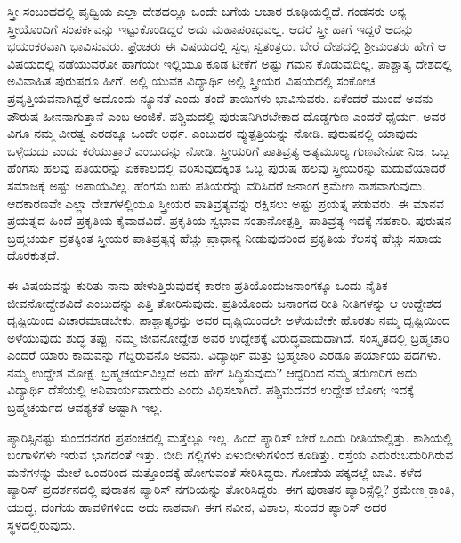 ಸ್ತ್ರೀ ಸಂಬಂಧದಲ್ಲಿ ಪೃಥ್ವಿಯ ಎಲ್ಲಾ ದೇಶದಲ್ಲೂ ಒಂದೇ ಬಗೆಯ ಆಚಾರ ರೂಢಿಯಲ್ಲಿದೆ. ಗಂಡಸರು ಅನ್ಯ ಸ್ತ್ರೀಯೊಂದಿಗೆ ಸಂಪರ್ಕವನ್ನು ಇಟ್ಟುಕೊಂಡಿದ್ದರೆ ಅದು ಮಹಾಪರಾಧವಲ್ಲ. ಆದರೆ ಸ್ತ್ರೀ ಹಾಗೆ ಇದ್ದರೆ ಅದನ್ನು ಭಯಂಕರವಾಗಿ ಭಾವಿಸುವರು. ಫ್ರೆಂಚರು ಈ ವಿಷಯದಲ್ಲಿ ಸ್ವಲ್ಪ ಸ್ವತಂತ್ರರು. ಬೇರೆ ದೇಶದಲ್ಲಿ ಶ‍್ರೀಮಂತರು ಹೇಗೆ ಆ ವಿಷಯದಲ್ಲಿ ನಡೆಯುವರೋ ಹಾಗೆಯೇ ಇಲ್ಲಿಯೂ ಕೂಡ ಟೀಕೆಗೆ ಅಷ್ಟು ಗಮನ ಕೊಡುವುದಿಲ್ಲ. ಪಾಶ್ಚಾತ್ಯ ದೇಶದಲ್ಲಿ ಅವಿವಾಹಿತ ಪುರುಷರೂ ಹೀಗೆ. ಅಲ್ಲಿ ಯುವಕ ವಿದ್ಯಾರ್ಥಿ ಅಲ್ಲಿ ಸ್ತ್ರೀಯರ ವಿಷಯದಲ್ಲಿ ಸಂಕೋಚ ಪ್ರವೃತ್ತಿಯವನಾಗಿದ್ದರೆ ಅದೊಂದು ನ್ಯೂನತೆ ಎಂದು ತಂದೆ ತಾಯಿಗಳು ಭಾವಿಸುವರು. ಏಕೆಂದರೆ ಮುಂದೆ ಅವನು ಪೌರುಷ ಹೀನನಾಗುತ್ತಾನೆ ಎಂಬ ಅಂಜಿಕೆ. ಪಶ್ಚಿಮದಲ್ಲಿ ಪುರುಷನಿಗಿರಬೇಕಾದ ದೊಡ್ಡಗುಣ ಎಂದರೆ ಧೈರ್ಯ. ಅವರ  ವಿಗೂ ನಮ್ಮ ವೀರತ್ವ ಎರಡಕ್ಕೂ ಒಂದೇ ಅರ್ಥ.  ಎಂಬುದರ ವ್ಯುತ್ಪತ್ತಿಯನ್ನು ನೋಡಿ. ಪುರುಷನಲ್ಲಿ ಯಾವುದು ಒಳ್ಳೆಯದು ಎಂದು ಕರೆಯುತ್ತಾರೆ ಎಂಬುದನ್ನು ನೋಡಿ. ಸ್ತ್ರೀಯರಿಗೆ ಪಾತಿವ್ರತ್ಯ ಅತ್ಯಮೂಲ್ಯ ಗುಣವೇನೋ ನಿಜ. ಒಬ್ಬ ಹೆಂಗಸು ಹಲವು ಪತಿಯರನ್ನು ಏಕಕಾಲದಲ್ಲಿ ವರಿಸುವುದಕ್ಕಿಂತ ಒಬ್ಬ ಪುರುಷ ಹಲವು ಸ್ತ್ರೀಯರನ್ನು ಮದುವೆಯಾದರೆ ಸಮಾಜಕ್ಕೆ ಅಷ್ಟು ಅಪಾಯವಿಲ್ಲ. ಹೆಂಗಸು ಬಹು ಪತಿಯರನ್ನು ವರಿಸಿದರೆ ಜನಾಂಗ ಕ್ರಮೇಣ ನಾಶವಾಗುವುದು. ಆದಕಾರಣವೇ ಎಲ್ಲಾ ದೇಶಗಳಲ್ಲಿಯೂ ಸ್ತ್ರೀಯರ ಪಾತಿವ್ರತ್ಯವನ್ನು ರಕ್ಷಿಸಲು ಅಷ್ಟು ಪ್ರಯತ್ನ ಪಡುವರು. ಈ ಮಾನವ ಪ್ರಯತ್ನದ ಹಿಂದೆ ಪ್ರಕೃತಿಯ ಕೈವಾಡವಿದೆ. ಪ್ರಕೃತಿಯ ಸ್ವಭಾವ ಸಂತಾನೋತ್ಪತ್ತಿ. ಪಾತಿವ್ರತ್ಯ ಇದಕ್ಕೆ ಸಹಕಾರಿ. ಪುರುಷನ ಬ್ರಹ್ಮಚರ್ಯ ವ್ರತಕ್ಕಿಂತ ಸ್ತ್ರೀಯರ ಪಾತಿವ್ರತ್ಯಕ್ಕೆ ಹೆಚ್ಚು ಪ್ರಾಧಾನ್ಯ ನೀಡುವುದರಿಂದ ಪ್ರಕೃತಿಯ ಕೆಲಸಕ್ಕೆ ಹೆಚ್ಚು ಸಹಾಯ ದೊರಕುತ್ತದೆ.

ಈ ವಿಷಯವನ್ನು ಕುರಿತು ನಾನು ಹೇಳುತ್ತಿರುವುದಕ್ಕೆ ಕಾರಣ ಪ್ರತಿಯೊಂದು\break ಜನಾಂಗಕ್ಕೂ ಒಂದು ನೈತಿಕ ಜೀವನೋದ್ದೇಶವಿದೆ ಎಂಬುದನ್ನು ಎತ್ತಿ ತೋರಿಸುವುದು. ಪ್ರತಿಯೊಂದು ಜನಾಂಗದ ರೀತಿ ನೀತಿಗಳನ್ನು ಆ ಉದ್ದೇಶದ ದೃಷ್ಟಿಯಿಂದ ವಿಚಾರಮಾಡ\break ಬೇಕು. ಪಾಶ್ಚಾತ್ಯರನ್ನು ಅವರ ದೃಷ್ಟಿಯಿಂದಲೇ ಅಳೆಯಬೇಕೇ ಹೊರತು ನಮ್ಮ ದೃಷ್ಟಿಯಿಂದ ಅಳೆಯುವುದು ಶುದ್ಧ ತಪ್ಪು. ನಮ್ಮ ಜೀವನೋದ್ದೇಶ ಅವರ ಉದ್ದೇಶಕ್ಕೆ ವಿರುದ್ಧ\break ವಾದುದಾಗಿದೆ. ಸಂಸ್ಕೃತದಲ್ಲಿ ಬ್ರಹ್ಮಚಾರಿ ಎಂದರೆ ಯಾರು ಕಾಮವನ್ನು ಗೆದ್ದಿರುವನೊ ಅವನು. ವಿದ್ಯಾರ್ಥಿ ಮತ್ತು ಬ್ರಹ್ಮಚಾರಿ ಎರಡೂ ಪರ್ಯಾಯ ಪದಗಳು. ನಮ್ಮ ಉದ್ದೇಶ ಮೋಕ್ಷ. ಬ್ರಹ್ಮಚರ್ಯವಿಲ್ಲದೆ ಅದು ಹೇಗೆ ಸಿದ್ಧಿಸುವುದು? ಆದ್ದರಿಂದ ನಮ್ಮ ತರುಣರಿಗೆ ಅದು ವಿದ್ಯಾರ್ಥಿ ದೆಸೆಯಲ್ಲಿ ಅನಿವಾರ್ಯವಾದುದು ಎಂದು ವಿಧಿಸಲಾಗಿದೆ. ಪಶ್ಚಿಮದವರ ಉದ್ದೇಶ ಭೋಗ; ಇದಕ್ಕೆ ಬ್ರಹ್ಮಚರ್ಯದ ಆವಶ್ಯಕತೆ ಅಷ್ಟಾಗಿ ಇಲ್ಲ.

\newpage

ಪ್ಯಾರಿಸ್ಸಿನಷ್ಟು ಸುಂದರನಗರ ಪ್ರಪಂಚದಲ್ಲಿ ಮತ್ತೆಲ್ಲೂ ಇಲ್ಲ. ಹಿಂದೆ ಪ್ಯಾರಿಸ್​ ಬೇರೆ ಒಂದು ರೀತಿಯಾಲ್ಲಿತ್ತು. ಕಾಶಿಯಲ್ಲಿ ಬಂಗಾಳಿಗಳು ಇರುವ ಭಾಗದಂತೆ ಇತ್ತು. ಬೀದಿ ಗಲ್ಲಿಗಳು ಏಳುಬೀಳುಗಳಿಂದ ಕೂಡಿತ್ತು. ರಸ್ತೆಯ ಎದುರುಬದುರಿಗಿರುವ ಮನೆಗಳನ್ನು ಮೇಲೆ ಒಂದರಿಂದ ಮತ್ತೊಂದಕ್ಕೆ ಹೋಗುವಂತೆ ಸೇರಿಸಿದ್ದರು. ಗೋಡೆಯ ಪಕ್ಕದಲ್ಲೆ ಬಾವಿ. ಕಳೆದ ಪ್ಯಾರಿಸ್​ ಪ್ರದರ್ಶನದಲ್ಲಿ ಪುರಾತನ ಪ್ಯಾರಿಸ್​ ನಗರಿಯನ್ನು ತೋರಿಸಿದ್ದರು. ಈಗ ಪುರಾತನ ಪ್ಯಾರಿಸ್ಸೆಲ್ಲಿ? ಕ್ರಮೇಣ ಕ್ರಾಂತಿ, ಯುದ್ಧ, ದಂಗೆಯ ಹಾವಳಿಗಳಿಂದ ಅದು ನಾಶವಾಗಿ ಈಗ ನವೀನ, ವಿಶಾಲ, ಸುಂದರ ಪ್ಯಾರಿಸ್​ ಅದರ ಸ್ಥಳದಲ್ಲಿರುವುದು.

